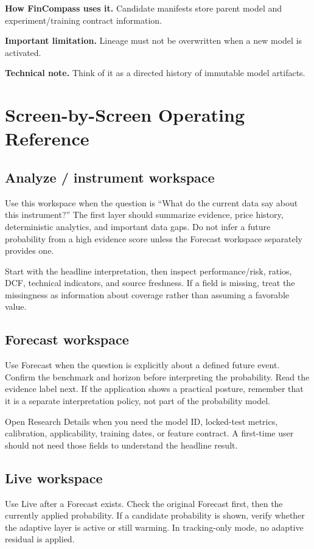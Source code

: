 \documentclass[11pt]{article}
\begin{document}
\textbf{How FinCompass uses it.} Candidate manifests store parent model and experiment/training contract information.

\textbf{Important limitation.} Lineage must not be overwritten when a new model is activated.

\textbf{Technical note.} Think of it as a directed history of immutable model artifacts.

\clearpage
\section{Screen-by-Screen Operating Reference}
\subsection{Analyze / instrument workspace}
Use this workspace when the question is ``What do the current data say about this instrument?'' The first layer should summarize evidence, price history, deterministic analytics, and important data gaps. Do not infer a future probability from a high evidence score unless the Forecast workspace separately provides one.

Start with the headline interpretation, then inspect performance/risk, ratios, DCF, technical indicators, and source freshness. If a field is missing, treat the missingness as information about coverage rather than assuming a favorable value.

\subsection{Forecast workspace}
Use Forecast when the question is explicitly about a defined future event. Confirm the benchmark and horizon before interpreting the probability. Read the evidence label next. If the application shows a practical posture, remember that it is a separate interpretation policy, not part of the probability model.

Open Research Details when you need the model ID, locked-test metrics, calibration, applicability, training dates, or feature contract. A first-time user should not need those fields to understand the headline result.

\subsection{Live workspace}
Use Live after a Forecast exists. Check the original Forecast first, then the currently applied probability. If a candidate probability is shown, verify whether the adaptive layer is active or still warming. In tracking-only mode, no adaptive residual is applied.
\end{document}
